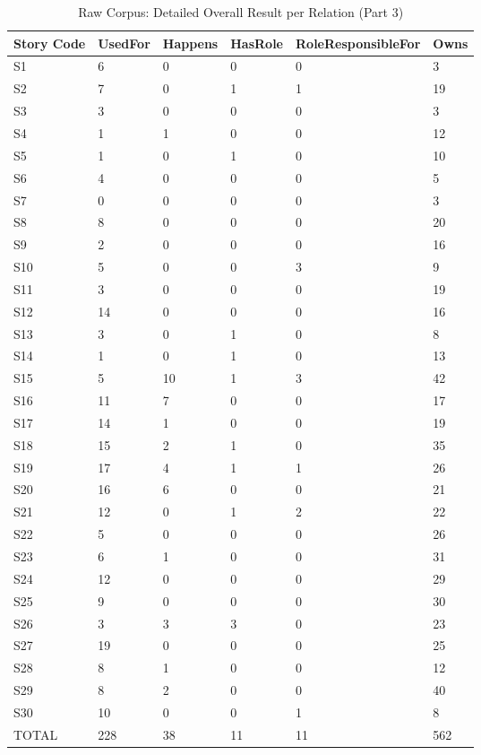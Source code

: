 \begin{table}[H]   %
\centering
\caption{Raw Corpus: Detailed Overall Result per Relation (Part 3)} \vspace{0.25em}
\begin{tabular}{|l|l|l|l|l|l|} \hline
\textbf{Story Code} & \textbf{UsedFor} & \textbf{Happens} & \textbf{HasRole} & \textbf{RoleResponsibleFor} & \textbf{Owns} \\ \hline
S1 & 6 & 0 & 0 & 0 & 3 \\ \hline
S2 & 7 & 0 & 1 & 1 & 19 \\ \hline
S3 & 3 & 0 & 0 & 0 & 3 \\ \hline
S4 & 1 & 1 & 0 & 0 & 12 \\ \hline
S5 & 1 & 0 & 1 & 0 & 10 \\ \hline
S6 & 4 & 0 & 0 & 0 & 5 \\ \hline
S7 & 0 & 0 & 0 & 0 & 3 \\ \hline
S8 & 8 & 0 & 0 & 0 & 20 \\ \hline
S9 & 2 & 0 & 0 & 0 & 16 \\ \hline
S10 & 5 & 0 & 0 & 3 & 9 \\ \hline
S11 & 3 & 0 & 0 & 0 & 19 \\ \hline
S12 & 14 & 0 & 0 & 0 & 16 \\ \hline
S13 & 3 & 0 & 1 & 0 & 8 \\ \hline
S14 & 1 & 0 & 1 & 0 & 13 \\ \hline
S15 & 5 & 10 & 1 & 3 & 42 \\ \hline
S16 & 11 & 7 & 0 & 0 & 17 \\ \hline
S17 & 14 & 1 & 0 & 0 & 19 \\ \hline
S18 & 15 & 2 & 1 & 0 & 35 \\ \hline
S19 & 17 & 4 & 1 & 1 & 26 \\ \hline
S20 & 16 & 6 & 0 & 0 & 21 \\ \hline
S21 & 12 & 0 & 1 & 2 & 22 \\ \hline
S22 & 5 & 0 & 0 & 0 & 26 \\ \hline
S23 & 6 & 1 & 0 & 0 & 31 \\ \hline
S24 & 12 & 0 & 0 & 0 & 29 \\ \hline
S25 & 9 & 0 & 0 & 0 & 30 \\ \hline
S26 & 3 & 3 & 3 & 0 & 23 \\ \hline
S27 & 19 & 0 & 0 & 0 & 25 \\ \hline
S28 & 8 & 1 & 0 & 0 & 12 \\ \hline
S29 & 8 & 2 & 0 & 0 & 40 \\ \hline
S30 & 10 & 0 & 0 & 1 & 8 \\ \hline
TOTAL & 228 & 38 & 11 & 11 & 562 \\ \hline
\end{tabular}
\label{tab:raw3}
\end{table}

